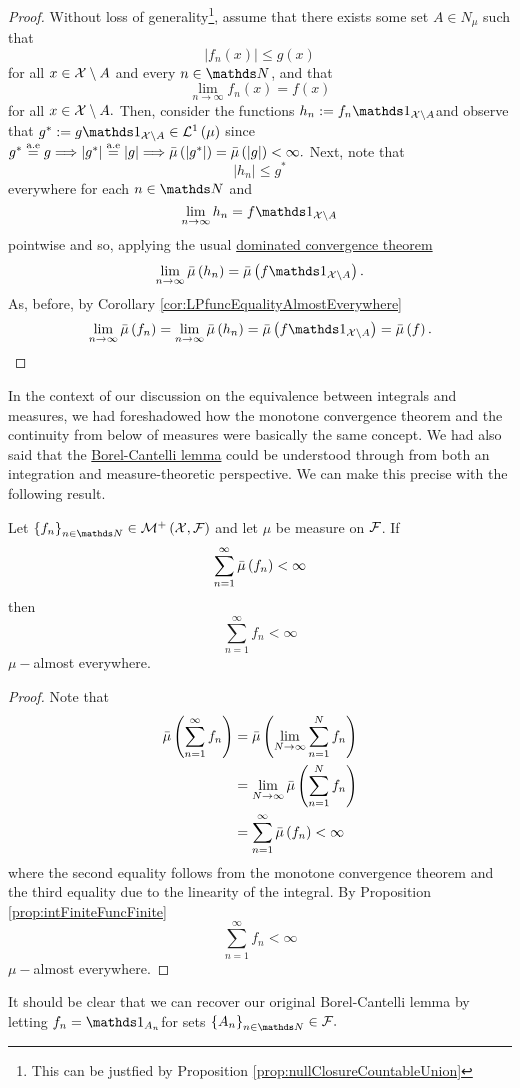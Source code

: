 \begin{proof}
Without loss of generality\footnote{This can be justfied by Proposition \ref{prop:nullClosureCountableUnion}},
assume that there exists some set $A\in N_{\mu}$ such that 
\[
\lvert f_{n}\left(x\right)\rvert\leq g\left(x\right)
\]
for all $x\in\mathcal{X}\setminus A$ and every $n\in\N$, and that
\[
\lim_{n\to\infty}f_{n}\left(x\right)=f\left(x\right)
\]
for all $x\in\mathcal{X}\setminus A.$ Then, consider the functions $h_{n}:=f_{n}\indicate_{\X\setminus A}$and
observe that $g^{*}:=g\indicate_{\X\setminus A}\in\Lp 1{\mu}$ since
$g^{*}\stackrel{\text{a.e}}{=}g\Longrightarrow\lvert g^{*}\rvert\stackrel{\text{a.e}}{=}\lvert g\rvert\Longrightarrow\bar{\mu}\left(\lvert g^{*}\rvert\right)=\bar{\mu}\left(\lvert g\rvert\right)<\infty.$
Next, note that 
\[
\lvert h_{n}\rvert\leq g^{*}
\]
everywhere for each $n\in\N$ and 
\[
\lim_{n\to\infty}h_{n}=f\indicate_{\X\setminus A}
\]
pointwise and so, applying the usual \hyperref[thm:dominatedConvergenceLebInt]{dominated convergence theorem}
\[
\lim_{n\to\infty}\lebInt{\mu}{h_{n}}=\lebInt{\mu}{f\indicate_{\X\setminus A}}.
\]
As, before, by Corollary \ref{cor:LPfuncEqualityAlmostEverywhere}
\[
\lim_{n\to\infty}\lebInt{\mu}{f_{n}}=\lim_{n\to\infty}\lebInt{\mu}{h_{n}}=\lebInt{\mu}{f\indicate_{\X\setminus A}}=\lebInt{\mu}f.
\]
\end{proof}
In the context of our discussion on the equivalence between integrals
and measures, we had foreshadowed how the monotone convergence theorem
and the continuity from below of measures were basically the same
concept. We had also said that the \hyperref[thm:borelCantelli]{Borel-Cantelli lemma}
could be understood through from both an integration and measure-theoretic
perspective. We can make this precise with the following result.
\begin{thm}
\label{thm:generalizedBorelCantelli}Let $\left\{ f_{n}\right\} _{n\in\N}\in\nonnegMeasurableFunctions$
and let $\mu$ be measure on $\mathcal{F}$. If 
\[
\sum_{n=1}^{\infty}\bar{\mu}\left(f_{n}\right)<\infty
\]
then
\[
\sum_{n=1}^{\infty}f_{n}<\infty
\]
$\mu-$almost everywhere.
\end{thm}

\begin{proof}
Note that 
\begin{align*}
\bar{\mu}\left(\sum_{n=1}^{\infty}f_{n}\right) & =\bar{\mu}\left(\lim_{N\to\infty}\sum_{n=1}^{N}f_{n}\right)\\
 & =\lim_{N\to\infty}\bar{\mu}\left(\sum_{n=1}^{N}f_{n}\right)\\
 & =\sum_{n=1}^{\infty}\bar{\mu}\left(f_{n}\right)<\infty
\end{align*}
where the second equality follows from the monotone convergence theorem
and the third equality due to the linearity of the integral. By Proposition
\ref{prop:intFiniteFuncFinite}
\[
\sum_{n=1}^{\infty}f_{n}<\infty
\]
$\mu-$almost everywhere.
\end{proof}
It should be clear that we can recover our original Borel-Cantelli
lemma by letting $f_{n}=\indicate_{A_{n}}$for sets $\left\{ A_{n}\right\} _{n\in\N}\in\F.$

